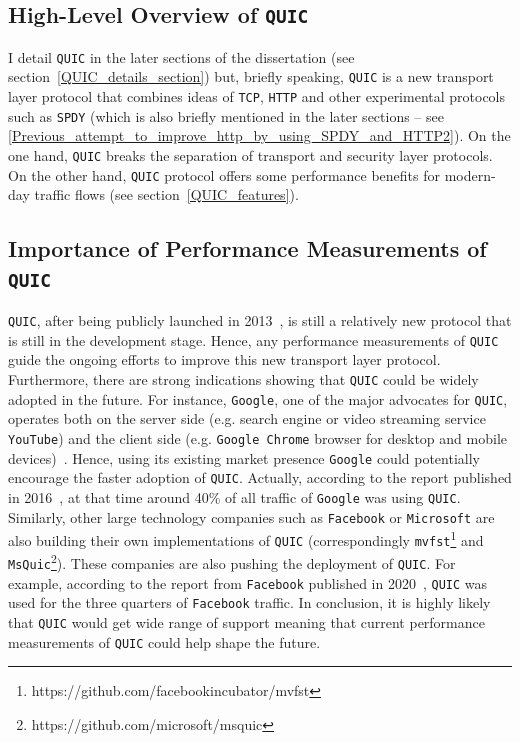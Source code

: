 \documentclass[12pt,a4paper,twoside,openright]{report}
\begin{document}
 

\subsection{High-Level Overview of \texttt{QUIC}}
I detail \texttt{QUIC} in the later sections of the dissertation (see section~\ref{QUIC_details_section}) but, briefly speaking, \texttt{QUIC} is a new transport layer protocol that combines ideas of \texttt{TCP}, \texttt{HTTP} and other experimental protocols such as \texttt{SPDY} (which is also briefly mentioned in the later sections -- see \ref{Previous_attempt_to_improve_http_by_using_SPDY_and_HTTP2}).
On the one hand, \texttt{QUIC} breaks the separation of transport and security layer protocols. 
On the other hand, \texttt{QUIC} protocol offers some performance benefits for modern-day traffic flows (see section~\ref{QUIC_features}).


\subsection{Importance of Performance Measurements of \texttt{QUIC}}

\texttt{QUIC}, after being publicly launched in 2013~\cite{Chromium_Blog_Experimenting_with_quic},  is still a relatively new protocol that is still in the development stage.
Hence, any performance measurements of \texttt{QUIC} guide the ongoing efforts to improve this new transport layer protocol.
Furthermore, there are strong indications showing that \texttt{QUIC} could be widely adopted in the future.
For instance, \texttt{Google}, one of the major advocates for \texttt{QUIC}, operates both on the server side (e.g. search engine or video streaming service \texttt{YouTube}) and the client side (e.g. \texttt{Google Chrome} browser for desktop and mobile devices)~\cite{A_QUICk_Introduction_to_HTTP3}.
Hence, using its existing market presence \texttt{Google} could potentially encourage the faster adoption of \texttt{QUIC}.
Actually, according to the report published in 2016~\cite{RuthJan2018AFLa}, at that time around 40\% of all traffic of \texttt{Google} was using \texttt{QUIC}.
Similarly, other large technology companies such as \texttt{Facebook} or \texttt{Microsoft} are also building their own implementations of \texttt{QUIC} (correspondingly \texttt{mvfst}\footnote{https://github.com/facebookincubator/mvfst} and \texttt{MsQuic}\footnote{https://github.com/microsoft/msquic}).
These companies are also pushing the deployment of \texttt{QUIC}. 
For example, according to the report from \texttt{Facebook} published in 2020~\cite{how-facebook-is-bringing-quic-to-billions}, \texttt{QUIC} was used for the three quarters of \texttt{Facebook} traffic. 
In conclusion, it is highly likely that \texttt{QUIC} would get wide range of support meaning that current performance measurements of \texttt{QUIC} could help shape the future.
\end{document}
